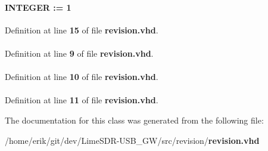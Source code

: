 \paragraph[{M\+I\+N\+O\+R\+\_\+\+R\+EV}]{ {\bfseries \textcolor{comment}{I\+N\+T\+E\+G\+ER}\textcolor{vhdlchar}{ }\textcolor{vhdlchar}{ }\textcolor{vhdlchar}{\+:}\textcolor{vhdlchar}{=}\textcolor{vhdlchar}{ }\textcolor{vhdlchar}{ } \textcolor{vhdldigit}{1} \textcolor{vhdlchar}{ }} \hspace{0.3cm}{\ttfamily [Constant]}}\label{classrevisions_a69f570a4e68b672db15f8865c3e99491}


Definition at line {\bf 15} of file {\bf revision.\+vhd}.

\paragraph[{std\+\_\+logic\+\_\+1164}]{\hspace{0.3cm}{\ttfamily [Package]}}\label{classrevisions_acd03516902501cd1c7296a98e22c6fcb}


Definition at line {\bf 9} of file {\bf revision.\+vhd}.

\paragraph[{std\+\_\+logic\+\_\+arith}]{\hspace{0.3cm}{\ttfamily [Package]}}\label{classrevisions_a0f5ecc6613f63d07f7963a97b1b26095}


Definition at line {\bf 10} of file {\bf revision.\+vhd}.

\paragraph[{std\+\_\+logic\+\_\+unsigned}]{\hspace{0.3cm}{\ttfamily [Package]}}\label{classrevisions_a598da929e807d58939b47499e8bc9fa8}


Definition at line {\bf 11} of file {\bf revision.\+vhd}.



The documentation for this class was generated from the following file\+:\begin{DoxyCompactItemize}
\item 
/home/erik/git/dev/\+Lime\+S\+D\+R-\/\+U\+S\+B\+\_\+\+G\+W/src/revision/{\bf revision.\+vhd}\end{DoxyCompactItemize}
